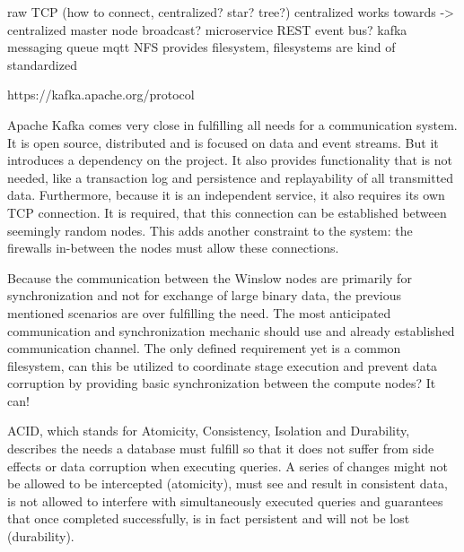 raw TCP (how to connect, centralized? star? tree?) centralized works towards -> centralized master node
broadcast?
microservice REST
event bus? kafka
messaging queue mqtt
NFS provides filesystem, filesystems are kind of standardized

https://kafka.apache.org/protocol

Apache Kafka  comes very close in fulfilling all needs for a communication system.
It is open source, distributed and is focused on data and event streams.
But it introduces a dependency on the project.
It also provides functionality that is not needed, like a transaction log and persistence and replayability of all transmitted data.
Furthermore, because it is an independent service, it also requires its own TCP connection.
It is required, that this connection can be established between seemingly random nodes.
This adds another constraint to the system: the firewalls in-between the nodes must allow these connections.

Because the communication between the Winslow nodes are primarily for synchronization and not for exchange of large binary data, the previous mentioned scenarios are over fulfilling the need.
 The most anticipated communication and synchronization mechanic should use and already established communication channel.
The only defined requirement yet is a common filesystem, can this be utilized to coordinate stage execution and prevent data corruption by providing basic synchronization between the compute nodes? It can!

ACID, which stands for Atomicity, Consistency, Isolation and Durability, describes the needs a database must fulfill so that it does not suffer from side effects or data corruption when executing queries.
A series of changes might not be allowed to be intercepted (atomicity), must see and result in consistent data, is not allowed to interfere with simultaneously executed queries and guarantees that once completed successfully, is in fact persistent and will not be lost (durability).








